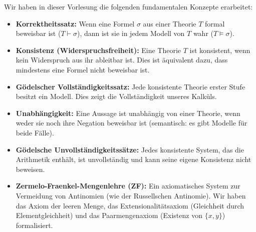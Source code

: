 \begin{math-stroke}[Paarmengen]


\end{math-stroke}

\begin{nice-box}
Wir haben in dieser Vorlesung die folgenden fundamentalen Konzepte erarbeitet:
\begin{itemize}
    \item \textbf{Korrektheitssatz:} Wenn eine Formel $\sigma$ aus einer Theorie $T$ formal beweisbar ist ($T \vdash \sigma$), dann ist sie in jedem Modell von $T$ wahr ($T \models \sigma$).
    \item \textbf{Konsistenz (Widerspruchsfreiheit):} Eine Theorie $T$ ist konsistent, wenn kein Widerspruch aus ihr ableitbar ist. Dies ist äquivalent dazu, dass mindestens eine Formel nicht beweisbar ist.
    \item \textbf{Gödelscher Vollständigkeitssatz:} Jede konsistente Theorie erster Stufe besitzt ein Modell. Dies zeigt die Vollständigkeit unseres Kalküls.
    \item \textbf{Unabhängigkeit:} Eine Aussage ist unabhängig von einer Theorie, wenn weder sie noch ihre Negation beweisbar ist (semantisch: es gibt Modelle für beide Fälle).
    \item \textbf{Gödelsche Unvollständigkeitssätze:} Jedes konsistente System, das die Arithmetik enthält, ist unvollständig und kann seine eigene Konsistenz nicht beweisen.
    \item \textbf{Zermelo-Fraenkel-Mengenlehre (ZF):} Ein axiomatisches System zur Vermeidung von Antinomien (wie der Russellschen Antinomie). Wir haben das Axiom der leeren Menge, das Extensionalitätsaxiom (Gleichheit durch Elementgleichheit) und das Paarmengenaxiom (Existenz von $\{x,y\}$) formalisiert.
\end{itemize}
\end{nice-box}

